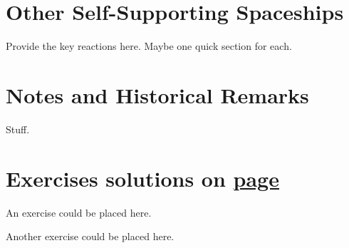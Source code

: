 


\section{Other Self-Supporting Spaceships}\label{sec:other_self_support}

Provide the key reactions here. Maybe one quick section for each.



\section{Notes and Historical Remarks}\label{sec:self_support_history}

Stuff.




\section*{Exercises \hfill \normalfont\textsf{\small solutions on \hyperlink{solutions_self_support_spaceships}{page \pageref{solutions_self_support_spaceships}}}}
\label{sec:solutions_self_support_spaceships}
\vspace*{-0.4cm}\hrulefill\vspace*{-0.3cm}\footnotesize\begin{multicols}{2}\vspace*{-0.4cm}\raggedcolumns{}
\setlength{\parskip}{0pt}


\begin{problem}\label{exer:self_support_spaceships_ex1}
	An exercise could be placed here.
\end{problem}


\mfilbreak


\begin{problem}\label{exer:self_support_spaceships_ex2}
	Another exercise could be placed here.
\end{problem}


\end{multicols}
\normalsize\vspace*{0.01cm}
